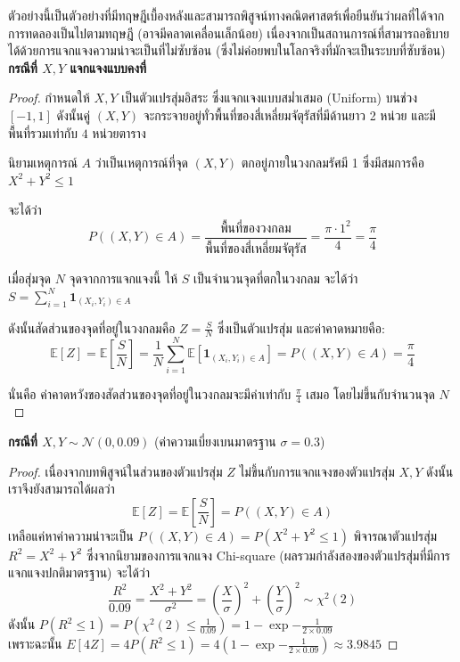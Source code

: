 \begin{tcolorbox}[colback=white!100!white, colframe=black!80!white,
  title=หมายเหตุ (สำหรับอ่านเพิ่มเติม),
  fonttitle=\bfseries,
  sharp corners=southwest,
  boxrule=0.8pt,
  left=1mm, right=1mm, top=1mm, bottom=1mm, breakable
]
    ตัวอย่างนี้เป็นตัวอย่างที่มีทฤษฎีเบื้องหลังและสามารถพิสูจน์ทางคณิตศาสตร์เพื่อยืนยันว่าผลที่ได้จากการทดลองเป็นไปตามทฤษฎี (อาจมีคลาดเคลื่อนเล็กน้อย) เนื่องจากเป็นสถานการณ์ที่สามารถอธิบายได้ด้วยการแจกแจงความน่าจะเป็นที่ไม่ซับซ้อน (ซึ่งไม่ค่อยพบในโลกจริงที่มักจะเป็นระบบที่ซับซ้อน)
    \newpage
    \textbf{กรณีที่ $X, Y$ แจกแจงแบบคงที่}
    \begin{proof}
        กำหนดให้ $X, Y$ เป็นตัวแปรสุ่มอิสระ ซึ่งแจกแจงแบบสม่ำเสมอ (Uniform) บนช่วง $[-1, 1]$ ดังนั้นคู่ $(X, Y)$ จะกระจายอยู่ทั่วพื้นที่ของสี่เหลี่ยมจัตุรัสที่มีด้านยาว 2 หน่วย และมีพื้นที่รวมเท่ากับ $4$ หน่วยตาราง

        นิยามเหตุการณ์ $A$ ว่าเป็นเหตุการณ์ที่จุด $(X, Y)$ ตกอยู่ภายในวงกลมรัศมี 1 ซึ่งมีสมการคือ $X^2 + Y^2 \leq 1$

        จะได้ว่า
        \[
            P((X, Y) \in A) = \frac{\text{พื้นที่ของวงกลม}}{\text{พื้นที่ของสี่เหลี่ยมจัตุรัส}} = \frac{\pi \cdot 1^2}{4} = \frac{\pi}{4}
        \]

        เมื่อสุ่มจุด $N$ จุดจากการแจกแจงนี้ ให้ $S$ เป็นจำนวนจุดที่ตกในวงกลม จะได้ว่า $S = \sum_{i=1}^N \mathbf{1}_{(X_i, Y_i) \in A}$

        ดังนั้นสัดส่วนของจุดที่อยู่ในวงกลมคือ $Z = \frac{S}{N}$ ซึ่งเป็นตัวแปรสุ่ม และค่าคาดหมายคือ:
        \[
            \mathbb{E}\left[Z\right] =\mathbb{E}\left[\frac{S}{N}\right] = \frac{1}{N} \sum_{i=1}^N \mathbb{E}\left[\mathbf{1}_{(X_i, Y_i) \in A}\right] = P((X, Y) \in A) = \frac{\pi}{4}
        \]

        นั่นคือ ค่าคาดหวังของสัดส่วนของจุดที่อยู่ในวงกลมจะมีค่าเท่ากับ $\frac{\pi}{4}$ เสมอ โดยไม่ขึ้นกับจำนวนจุด $N$
    \end{proof}
    \vspace{1em}

    \textbf{กรณีที่ $X, Y \sim \mathcal{N}(0, 0.09)$} (ค่าความเบี่ยงเบนมาตรฐาน $\sigma = 0.3$)
    \begin{proof}
        เนื่องจากบทพิสูจน์ในส่วนของตัวแปรสุ่ม $Z$ ไม่ขึ้นกับการแจกแจงของตัวแปรสุ่ม $X,Y$ ดังนั้น เราจึงยังสามารถได้ผลว่า
        \[
            \mathbb{E}\left[Z\right] =\mathbb{E}\left[\frac{S}{N}\right] = P((X, Y) \in A)
        \]
        เหลือแค่หาค่าความน่าจะเป็น $P((X, Y) \in A) = P(X^2 + Y^2 \leq 1)$ พิจารณาตัวแปรสุ่ม $R^2=X^2 + Y^2$ ซึ่งจากนิยามของการแจกแจง Chi-square (ผลรวมกำลังสองของตัวแปรสุ่มที่มีการแจกแจงปกติมาตรฐาน) จะได้ว่า
        $$
        \frac{R^2}{0.09}=\frac{X^2 + Y^2}{\sigma^2} = \left( \frac{X}{\sigma} \right)^2 + \left( \frac{Y}{\sigma} \right)^2 \sim \chi^2(2)
        $$
        ดังนั้น $P(R^2 \leq 1) = P(\chi^2(2) \leq \frac{1}{0.09}) = 1-\exp{-\frac{1}{2\times 0.09}}$\\
        เพราะฉะนั้น $E[4Z] = 4P(R^2\leq 1) = 4\left( 1-\exp{-\frac{1}{2\times 0.09}}\right)\approx 3.9845$
    \end{proof}
\end{tcolorbox}



